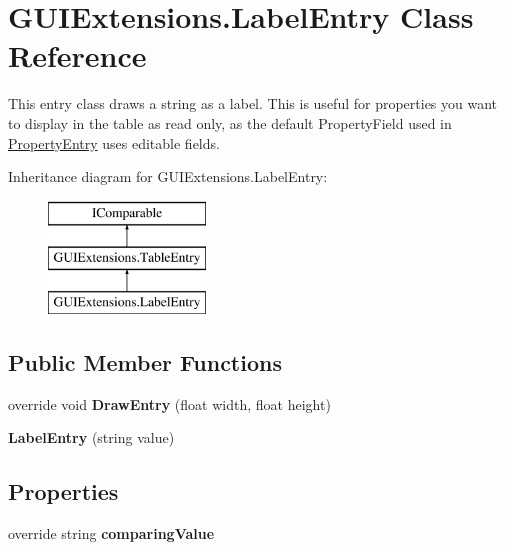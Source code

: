 \hypertarget{class_g_u_i_extensions_1_1_label_entry}{}\section{G\+U\+I\+Extensions.\+Label\+Entry Class Reference}
\label{class_g_u_i_extensions_1_1_label_entry}


This entry class draws a string as a label. This is useful for properties you want to display in the table as read only, as the default Property\+Field used in \mbox{\hyperlink{class_g_u_i_extensions_1_1_property_entry}{Property\+Entry}} uses editable fields.  


Inheritance diagram for G\+U\+I\+Extensions.\+Label\+Entry\+:\begin{figure}[H]
\begin{center}
\leavevmode
\includegraphics[height=3.000000cm]{class_g_u_i_extensions_1_1_label_entry}
\end{center}
\end{figure}
\subsection*{Public Member Functions}
\begin{DoxyCompactItemize}
\item 
\mbox{\label{class_g_u_i_extensions_1_1_label_entry_acd1df46f271a40e97c396c6099c0e9f5}} 
override void {\bfseries Draw\+Entry} (float width, float height)
\item 
\mbox{\label{class_g_u_i_extensions_1_1_label_entry_a40cd1ac009a43e0a6286e6feca39c60a}} 
{\bfseries Label\+Entry} (string value)
\end{DoxyCompactItemize}
\subsection*{Properties}
\begin{DoxyCompactItemize}
\item 
\mbox{\label{class_g_u_i_extensions_1_1_label_entry_ab0ee942386b9a1471250f468ec41acf6}} 
override string {\bfseries comparing\+Value}
\end{DoxyCompactItemize}


